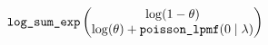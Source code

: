 \begin{equation*}
	\verb|log_sum_exp| \begin{pmatrix} \log(1-\theta) \\ \log(\theta) + \verb|poisson_lpmf|(0\mid\lambda)\end{pmatrix}
\end{equation*}
